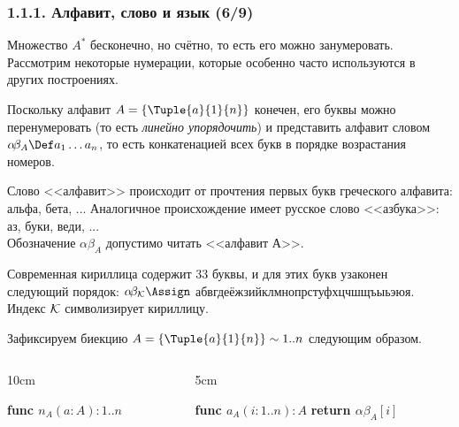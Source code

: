 \begin{frame}
\frametitle{1.1.1. Алфавит, слово и язык (6/9)}
Множество $A^*$ бесконечно, но счётно, то есть 
его можно занумеровать. Рассмотрим некоторые нумерации, которые особенно часто используются
в других построениях.

Поскольку алфавит $A=\{\Tuple{a}{1}{n}\}$ конечен,
его буквы можно перенумеровать (то есть 
{\em линейно упорядочить}) и представить алфавит словом 
$\alpha\!\beta_A\Def a_1\dots a_{n}$,
то есть конкатенацией всех букв в порядке
возрастания номеров.


\begin{digress}
Слово <<алфавит>> происходит от прочтения
первых букв греческого алфавита:
альфа, бета, ... Аналогичное происхождение
имеет русское слово <<азбука>>: аз, буки, веди, ... \\Обозначение $\alpha\!\beta_A$ допустимо читать <<алфавит А>>.
\end{digress}

\begin{example}
Современная кириллица содержит 33 буквы,
и для этих букв узаконен следующий порядок:
$\alpha\!\beta_{\cal{K}}\Assign$ абвгдеёжзийклмнопрстуфхцчшщъыьэюя. 
Индекс $\cal{K}$ символизирует кириллицу.
\end{example}

Зафиксируем биекцию
$A=\{\Tuple{a}{1}{n}\} \sim 1..n$ следующим образом.

\vspace{-16pt}
\begin{columns}[t]
\begin{column}{10cm}
\begin{algorithmic}
\STATE \textbf{func $n_A(a : A) : 1..n$}
\ENDFOR
\end{algorithmic}
\end{column}    
\begin{column}{5cm}
\begin{algorithmic}
\STATE \textbf{func $a_A(i : 1..n) : A$}
\STATE \textbf{return $\alpha\!\beta_A[i]$}
\end{algorithmic}
\end{column}
\end{columns}    


\end{frame}

